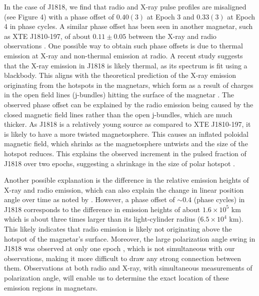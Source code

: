\documentclass[twocolumn]{emulateapj}
\begin{document}
In the case of J1818, we find that radio and X-ray pulse profiles are misaligned (see Figure 4) with a phase offset of $0.40(3)$ at Epoch 3 and $0.33(3)$ at Epoch 4 in phase cycles. A similar phase offset has been seen in another magnetar, such as XTE J1810-197, of about $0.11 \pm 0.05$ between the X-ray and radio observations \citep{pearlman2020bright}. One possible way to obtain such phase offsets is due to thermal emission at X-ray and non-thermal emission at radio. A recent study \citep{hu2020} suggests that the X-ray emission in J1818 is likely thermal, as its spectrum is fit using a blackbody. This aligns with the theoretical prediction of the X-ray emission originating from the hotspots in the magnetars, which form as a result of charges in the open field lines (j-bundles) hitting the surface of the magnetar \citep{beloborodov2009}. The observed phase offset can be explained by the radio emission being caused by the closed magnetic field lines rather than the open j-bundles, which are much thicker. As J1818 is a relatively young source as compared to XTE J1810-197, it is likely to have a more twisted magnetosphere. This causes an inflated poloidal magnetic field, which shrinks as the magnetosphere untwists and the size of the hotspot reduces. This explains the observed increment in the pulsed fraction of J1818 over two epochs, suggesting a shrinkage in the size of polar hotspot \citep{hu2020}.  %

Another possible explanation is the difference in the relative emission heights of X-ray and radio emission, which can also explain the change in linear position angle over time as noted by \cite{marcus2020b}. However, a phase offset of $\sim0.4$ (phase cycles) in J1818 corresponds to the difference in emission heights of about $1.6 \times 10^5$ km which is about three times larger than its light-cylinder radius ($6.5 \times 10^{4}$ km). This likely indicates that radio emission is likely not originating above the hotspot of the magnetar's surface. Moreover, the large polarization angle swing in J1818 was observed at only one epoch \citep{marcus2020b}, which is not simultaneous with our observations, making it more difficult to draw any strong connection between them. Observations at both radio and X-ray, with simultaneous measurements of polarization angle, will enable us to determine the exact location of these emission regions in magnetars.
    
\end{document}
